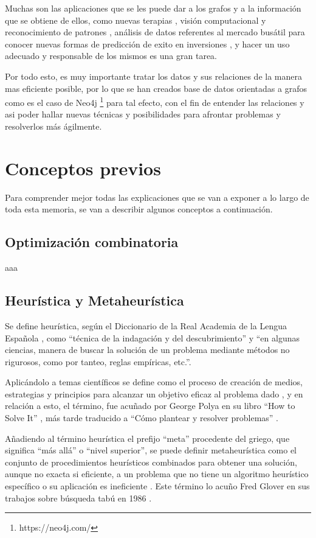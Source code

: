 Muchas son las aplicaciones que se les puede dar a los grafos y a la información que se obtiene de ellos, como nuevas terapias \cite{top-molec}, visión computacional y reconocimiento de patrones \cite{mcp-compVision}, análisis de datos referentes al mercado busátil \cite{market-data} para conocer nuevas formas de predicción de exito en inversiones \cite{vid-graf-ai}, y hacer un uso adecuado y responsable de los mismos es una gran tarea.

Por todo esto, es muy importante tratar los datos y sus relaciones de la manera mas eficiente posible, por lo que se han creados base de datos orientadas a grafos como es el caso de Neo4j \footnote{https://neo4j.com/} para tal efecto, con el fin de entender las relaciones y asi poder hallar nuevas técnicas y posibilidades para afrontar problemas y resolverlos más ágilmente.


\section{Conceptos previos}
Para comprender mejor todas las explicaciones que se van a exponer a lo largo de toda esta memoria, se van a describir algunos conceptos a continuación.

\subsection{Optimización combinatoria}
aaa

\subsection{Heurística y Metaheurística}
Se define heurística, según el Diccionario de la Real Academia de la Lengua Española \cite{rae-heuristica}, como ``técnica de la indagación y del descubrimiento'' y ``en algunas ciencias, manera de buscar la solución de un problema mediante métodos no rigurosos, como por tanteo, reglas empíricas, etc.''.

Aplicándolo a temas científicos se define como el proceso de creación de medios, estrategias y principios para alcanzar un objetivo eficaz al problema dado \cite{conceptodef-heuristica}, y en relación a esto, el término, fue acuñado por George Polya en su libro ``How to Solve It'' \cite{gpolya-book-1}, más tarde traducido a ``Cómo plantear y resolver problemas'' \cite{gpolya-book-2}.

Añadiendo al término heurística el prefijo ``meta'' procedente del griego, que significa ``más allá'' o ``nivel superior'', se puede definir metaheurística como el conjunto de procedimientos heurísticos combinados para obtener una solución, aunque no exacta si eficiente, a un problema que no tiene un algoritmo heurístico específico o su aplicación es ineficiente \cite{wiki-metaheuristica}. Este término lo acuño Fred Glover en sus trabajos sobre búsqueda tabú en 1986 \cite{fred-glover}.

